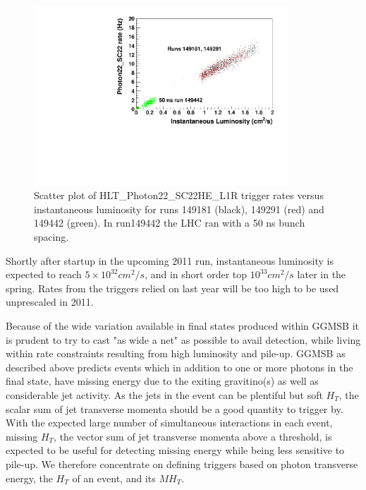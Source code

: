 \begin{figure}[!ht]
  \centering
 \includegraphics[width=0.85\textwidth]{figures/photon22rates.pdf}
\caption{Scatter plot of HLT\_Photon22\_SC22HE\_L1R trigger rates versus instantaneous luminosity for runs 
149181 (black), 149291 (red) and 149442 (green).  In run149442 the LHC ran with a 50 ns bunch spacing.}
\label{fig:photon22rate}
\end{figure}

Shortly after startup in the upcoming 2011 run, instantaneous luminosity is expected to reach 
$5\times10^{32} cm^2/s$, and in short order top $10^{33} cm^2/s$
later in the spring.  Rates from the triggers relied on last year will be too high to be used unprescaled in 2011. 

Because of the wide variation available in final states produced within GGMSB it is prudent to try to 
cast "as wide a net" as possible to avail detection, while living within rate constraints resulting from 
high luminosity and pile-up.  GGMSB as described above predicts events which in addition to one or more photons 
in the final state, have missing energy due to the exiting gravitino(s) as well
as considerable jet activity.  As the jets in the event can be plentiful but soft $H_T$, the scalar sum
of jet transverse momenta should be a good quantity to trigger by.  With the expected large number of simultaneous
interactions in each event, missing $H_T$, the vector sum of jet transverse momenta above a threshold, is 
expected to be useful for detecting missing energy while being less sensitive to pile-up.  We therefore
concentrate on defining triggers based on photon transverse energy, the $H_T$ of an event, and its $MH_T$.

